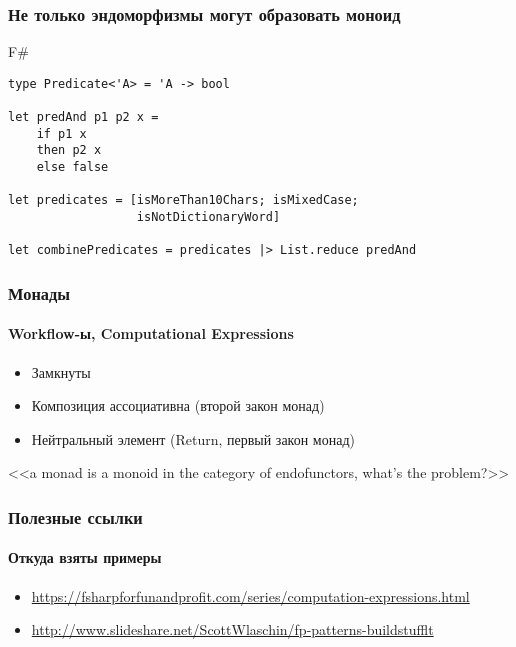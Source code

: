 \documentclass[xetex,mathserif,serif]{beamer}
\begin{document}
	\begin{frame}[fragile]
		\frametitle{Не только эндоморфизмы могут образовать моноид}
		\begin{exampleblock}{F\#}
			\begin{verbatim}
type Predicate<'A> = 'A -> bool

let predAnd p1 p2 x = 
    if p1 x 
    then p2 x
    else false

let predicates = [isMoreThan10Chars; isMixedCase; 
                  isNotDictionaryWord]

let combinePredicates = predicates |> List.reduce predAnd
			\end{verbatim}
		\end{exampleblock}
\end{frame}

	\begin{frame}
		\frametitle{Монады}
		\framesubtitle{Workflow-ы, Computational Expressions}
		\begin{itemize}
			\item Замкнуты
			\item Композиция ассоциативна (второй закон монад)
			\item Нейтральный элемент (Return, первый закон монад)
		\end{itemize}
		<<a monad is a monoid in the category of endofunctors, what's the problem?>>
	\end{frame}

	\begin{frame}
		\frametitle{Полезные ссылки}
		\framesubtitle{Откуда взяты примеры}
		\begin{small}
			\begin{itemize}
				\item \url{https://fsharpforfunandprofit.com/series/computation-expressions.html}
				\item \url{http://www.slideshare.net/ScottWlaschin/fp-patterns-buildstufflt}
			\end{itemize}
		\end{small}
	\end{frame}
\end{document}
